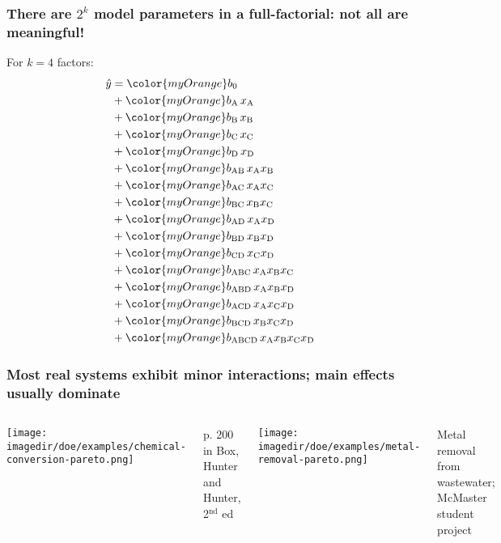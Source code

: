 \documentclass[handout,11pt,aspectratio=169,mathserif]{beamer}
\begin{document}
\begin{frame}\frametitle{There are $2^k$ model parameters in a full-factorial: not all are meaningful!}
	\vspace{6pt}
	For $k=4$ factors:
	\vspace{-6pt}
		{\scriptsize
		\begin{align*}
			\hat{y} &= {\color{myOrange}b_0}\\
					&+ {\color{myOrange}b_\text{A}\,}x_\text{A}\\
					&+ {\color{myOrange}b_\text{B}\,}x_\text{B}\\
					&+ {\color{myOrange}b_\text{C}\,}x_\text{C}\\
					&+ {\color{myOrange}b_\text{D}\,}x_\text{D}\\
					&+ {\color{myOrange}b_\text{AB}\,}x_\text{A}x_\text{B}\\
					&+ {\color{myOrange}b_\text{AC}\,}x_\text{A}x_\text{C}\\
					&+ {\color{myOrange}b_\text{BC}\,}x_\text{B}x_\text{C}\\
					&+ {\color{myOrange}b_\text{AD}\,}x_\text{A}x_\text{D}\\
					&+ {\color{myOrange}b_\text{BD}\,}x_\text{B}x_\text{D}\\
					&+ {\color{myOrange}b_\text{CD}\,}x_\text{C}x_\text{D}\\
					&+ {\color{myOrange}b_\text{ABC}\,}x_\text{A}x_\text{B}x_\text{C}\\
					&+ {\color{myOrange}b_\text{ABD}\,}x_\text{A}x_\text{B}x_\text{D}\\
					&+ {\color{myOrange}b_\text{ACD}\,}x_\text{A}x_\text{C}x_\text{D}\\
					&+ {\color{myOrange}b_\text{BCD}\,}x_\text{B}x_\text{C}x_\text{D}\\
					&+ {\color{myOrange}b_\text{ABCD}\,}x_\text{A}x_\text{B}x_\text{C}x_\text{D}
		\end{align*}
		}
	

\end{frame}

\begin{frame}\frametitle{Most real systems exhibit minor interactions; main effects usually dominate}
	\begin{columns}[T]
			\texttt{[image: \\imagedir/doe/examples/chemical-conversion-pareto.png]}
			
			{\tiny p. 200 in Box, Hunter and Hunter, 2$^\text{nd}$ ed}
			
			\texttt{[image: \\imagedir/doe/examples/metal-removal-pareto.png]}
			
			{\tiny Metal removal from wastewater; McMaster student project}
			
	\end{columns}
	
\end{frame}
\end{document}
